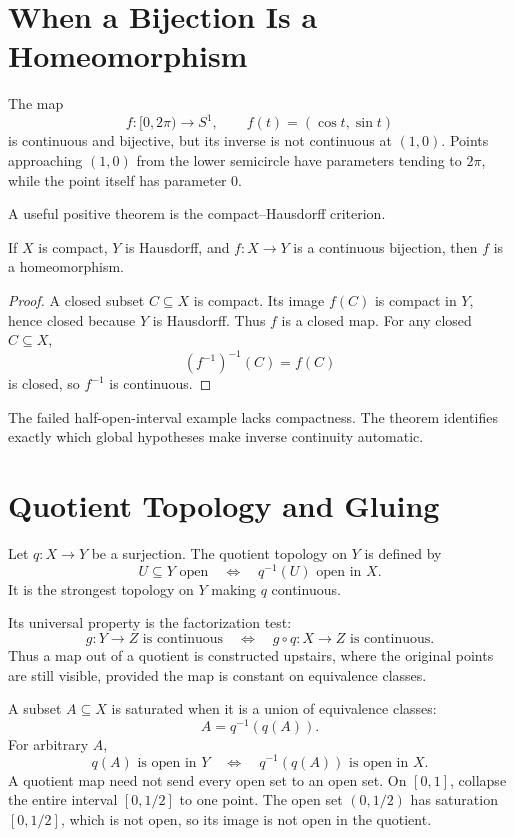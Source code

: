 \section{When a Bijection Is a Homeomorphism}

The map
\[
  f:[0,2\pi)\to S^1,
  \qquad
  f(t)=(\cos t,\sin t)
\]
is continuous and bijective, but its inverse is not continuous at \((1,0)\).  Points approaching \((1,0)\) from the lower semicircle have parameters tending to \(2\pi\), while the point itself has parameter \(0\).

A useful positive theorem is the compact--Hausdorff criterion.

\begin{theorem}
If \(X\) is compact, \(Y\) is Hausdorff, and \(f:X\to Y\) is a continuous bijection, then \(f\) is a homeomorphism.
\end{theorem}

\begin{proof}
A closed subset \(C\subseteq X\) is compact.  Its image \(f(C)\) is compact in \(Y\), hence closed because \(Y\) is Hausdorff.  Thus \(f\) is a closed map.  For any closed \(C\subseteq X\),
\[
  (f^{-1})^{-1}(C)=f(C)
\]
is closed, so \(f^{-1}\) is continuous.
\end{proof}

The failed half-open-interval example lacks compactness.  The theorem identifies exactly which global hypotheses make inverse continuity automatic.

\section{Quotient Topology and Gluing}

Let \(q:X\to Y\) be a surjection.  The quotient topology on \(Y\) is defined by
\[
  U\subseteq Y\text{ open}
  \quad\Longleftrightarrow\quad
  q^{-1}(U)\text{ open in }X.
\]
It is the strongest topology on \(Y\) making \(q\) continuous.

Its universal property is the factorization test:
\[
  g:Y\to Z\text{ is continuous}
  \quad\Longleftrightarrow\quad
  g\circ q:X\to Z\text{ is continuous}.
\]
Thus a map out of a quotient is constructed upstairs, where the original points are still visible, provided the map is constant on equivalence classes.

A subset \(A\subseteq X\) is saturated when it is a union of equivalence classes:
\[
  A=q^{-1}(q(A)).
\]
For arbitrary \(A\),
\[
  q(A)\text{ is open in }Y
  \quad\Longleftrightarrow\quad
  q^{-1}(q(A))\text{ is open in }X.
\]
A quotient map need not send every open set to an open set.  On \([0,1]\), collapse the entire interval \([0,1/2]\) to one point.  The open set \((0,1/2)\) has saturation \([0,1/2]\), which is not open, so its image is not open in the quotient.

